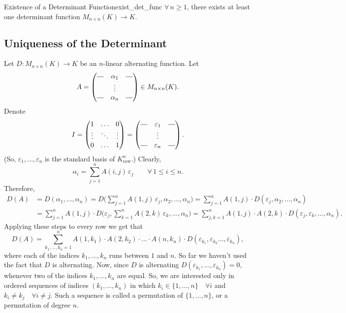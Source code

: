 \begin{corollary}{Existence of a Determinant Function}{exist_det_func}
	$\forall \, n \geq 1$, there exists at least one determinant function $M_{n\times n}(K) \to K$.
\end{corollary}

\subsection{Uniqueness of the Determinant}
Let $D:M_{n\times n}(K) \to K$ be an $n$-linear alternating function. Let
\[
	A = \begin{pmatrix}
		\rule[0.5ex]{1em}{0.4pt} & \alpha_1 & \rule[0.5ex]{1em}{0.4pt}\\
		& \vdots & \\
		\rule[0.5ex]{1em}{0.4pt} & \alpha_n & \rule[0.5ex]{1em}{0.4pt}
	\end{pmatrix} \in M_{n\times n}(K).
\]
Denote
\[
	I = \begin{pmatrix}
		1 & \hdots & 0\\
		\vdots &\ddots & \vdots\\
		0 & \hdots & 1
	\end{pmatrix}
	=
	\begin{pmatrix}
		\rule[0.5ex]{1em}{0.4pt} & \varepsilon_1 & \rule[0.5ex]{1em}{0.4pt}\\
		& \vdots & \\
		\rule[0.5ex]{1em}{0.4pt} & \varepsilon_n & \rule[0.5ex]{1em}{0.4pt}
	\end{pmatrix}.
\]
(So, $\varepsilon_1, \hdots , \varepsilon_n$ is the standard basis of $K^n_{\text{row}}$.) Clearly, 
\[
	\alpha_i = \sum_{j=1}^{n} A(i,j)\, \varepsilon_j \qquad \forall \, 1\leq i \leq n.
\]
Therefore,
\begin{align*}
	D(A) &= D(\alpha_1, \hdots , \alpha_n) = D\bigg( \sum_{j=1}^{n} A(1,j) \, \varepsilon_j, \alpha_2, \hdots , \alpha_n\bigg) = \sum_{j=1}^{n} A(1,j) \cdot D(\varepsilon_j, \alpha_2, \hdots , \alpha_n) \\
	&= \sum_{j=1}^{n} A(1, j)\cdot D\bigg(\varepsilon_j, \sum_{k=1}^{n} A(2, k)\, \varepsilon_k, \hdots, \alpha_n\bigg) = \sum_{j,k = 1}^{n} A(1,j)\cdot A(2,k) \cdot D(\varepsilon_j, \varepsilon_k, \hdots, \alpha_n).
\end{align*}
Applying these steps to every row we get that
\begin{equation}
	\label{eq:det_func}
	D(A) = \sum_{k_1, \hdots, k_n = 1}^{n} A(1, k_1)\cdot A(2, k_2)\cdot \hdots \cdot A(n, k_n)\cdot D(\varepsilon_{k_1}, \varepsilon_{k_2} \hdots, \varepsilon_{k_n}),
\end{equation}
where each of the indices $k_1, \hdots , k_n$ runs between $1$ and $n$. So far we haven't used the fact that $D$ is alternating. Now, since $D$ is alternating $D(\varepsilon_{k_1}, \hdots , \varepsilon_{k_n}) = 0$, whenever two of the indices $k_1, \hdots , k_n$ are equal. So, we are interested only in ordered sequences of indices $(k_1, \hdots, k_n)$ in which $k_i \in \{1, \hdots, n\} \quad \forall i$ and $k_i \neq k_j \quad \forall i \neq j$. Such a sequence is called a permutation of $\{1, \hdots , n\}$, or a permutation of degree $n$.

